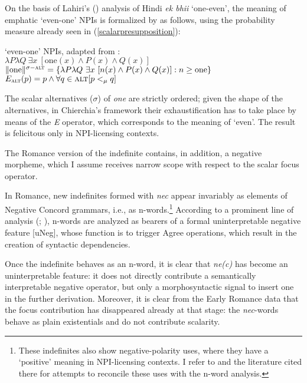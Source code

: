 \documentclass[output=paper]{langsci/langscibook}
\begin{document}
On the basis of Lahiri's (\citeyear{Lahiri98}) analysis of Hindi {\emph{ek bhii}} `one-even', the meaning of emphatic `even-one' NPIs is formalized by \citet[156]{Chierchia:2013} as follows, using the probability measure already seen in (\ref{scalarpresupposition}):\largerpage

\begin{exe}
\ex
\begin{xlist}
\ex \label{evenoneNPIChierchia} `even-one' NPIs, adapted from \citet[156]{Chierchia:2013}:\\
$\lambda P \lambda Q \ \exists x \ [\text{one}(x) \wedge P(x) \wedge Q(x) ]$\\
$\Vert \text{one} \Vert^{\sigma-\textsc{alt}} = \{ \lambda P \lambda Q \ \exists x \ [n(x) \wedge P(x) \wedge Q(x)]: n \geq \text{one} \}$
\ex $ E_{\textsc{alt}}(p) = p \wedge \forall q \in \textsc{alt} [p <_{\mu} q]$
\end{xlist}
\end{exe}

\noindent The scalar alternatives ($\sigma$) of {\emph{one}} are strictly ordered; given the shape of the alternatives, in Chierchia's framework their exhaustification has to take place by means of the {\emph{E}} operator, which corresponds to the meaning of `even'. The result is felicitous only in NPI-licensing contexts.

The Romance version of the indefinite contains, in addition, a negative morpheme, which I assume receives narrow scope with respect to the scalar focus operator.

In Romance, new indefinites formed with {\emph{nec}} appear invariably as elements of Negative Concord grammars, i.e., as n-words.{\footnote{These indefinites also show negative-polarity uses, where they have a `positive' meaning in NPI-licensing contexts. I refer to \citet[chapter 5]{Gianollo18} and the literature cited there for attempts to reconcile these uses with the n-word analysis.}}
According to a prominent line of analysis (\citealt[]{Zeijlstra04, Zeijlstra14}; \citealt[]{Penka11}), n-words are analyzed as bearers of a formal uninterpretable negative feature [uNeg], whose function is to trigger Agree operations, which result in the creation of syntactic dependencies.

Once the indefinite behaves as an n-word, it is clear that {\emph{ne(c)}} has become an uninterpretable feature: it does not directly contribute a semantically interpretable negative operator, but only a morphosyntactic signal to insert one in the further derivation. Moreover, it is clear from the Early Romance data that the focus contribution has disappeared already at that stage: the {\emph{nec}}-words behave as plain existentials and do not contribute scalarity.
\end{document}
